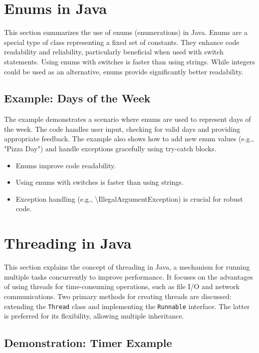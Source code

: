 \documentclass{article}
\begin{document}
\begin{itemize}
\section{Enums in Java}

This section summarizes the use of enums (enumerations) in Java.  Enums are a special type of class representing a fixed set of constants. They enhance code readability and reliability, particularly beneficial when used with switch statements.  Using enums with switches is faster than using strings.  While integers could be used as an alternative, enums provide significantly better readability.

\subsection{Example: Days of the Week}

The example demonstrates a scenario where enums are used to represent days of the week.  The code handles user input, checking for valid days and providing appropriate feedback.  The example also shows how to add new enum values (e.g., "Pizza Day") and handle exceptions gracefully using try-catch blocks.

\begin{itemize}
    \item Enums improve code readability.
    \item Using enums with switches is faster than using strings.
    \item Exception handling (e.g., \textbackslash{}IllegalArgumentException) is crucial for robust code.
\end{itemize}


\section{Threading in Java}

This section explains the concept of threading in Java, a mechanism for running multiple tasks concurrently to improve performance.  It focuses on the advantages of using threads for time-consuming operations, such as file I/O and network communications.  Two primary methods for creating threads are discussed: extending the \texttt{Thread} class and implementing the \texttt{Runnable} interface.  The latter is preferred for its flexibility, allowing multiple inheritance.


\subsection{Demonstration:  Timer Example}


\end{itemize}
\end{document}

